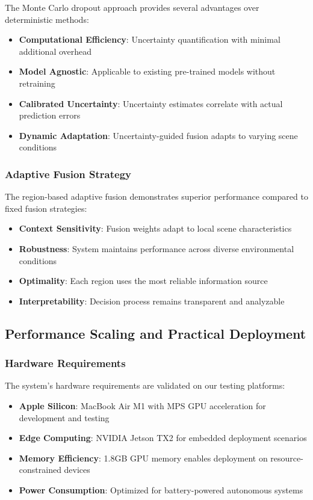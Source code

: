 \documentclass[10pt]{article}
\begin{document}
The Monte Carlo dropout approach provides several advantages over deterministic methods:

\begin{itemize}
\item \textbf{Computational Efficiency}: Uncertainty quantification with minimal additional overhead
\item \textbf{Model Agnostic}: Applicable to existing pre-trained models without retraining
\item \textbf{Calibrated Uncertainty}: Uncertainty estimates correlate with actual prediction errors
\item \textbf{Dynamic Adaptation}: Uncertainty-guided fusion adapts to varying scene conditions
\end{itemize}

\subsubsection{Adaptive Fusion Strategy}

The region-based adaptive fusion demonstrates superior performance compared to fixed fusion strategies:

\begin{itemize}
\item \textbf{Context Sensitivity}: Fusion weights adapt to local scene characteristics
\item \textbf{Robustness}: System maintains performance across diverse environmental conditions
\item \textbf{Optimality}: Each region uses the most reliable information source
\item \textbf{Interpretability}: Decision process remains transparent and analyzable
\end{itemize}

\subsection{Performance Scaling and Practical Deployment}

\subsubsection{Hardware Requirements}

The system's hardware requirements are validated on our testing platforms:

\begin{itemize}
\item \textbf{Apple Silicon}: MacBook Air M1 with MPS GPU acceleration for development and testing
\item \textbf{Edge Computing}: NVIDIA Jetson TX2 for embedded deployment scenarios
\item \textbf{Memory Efficiency}: 1.8GB GPU memory enables deployment on resource-constrained devices
\item \textbf{Power Consumption}: Optimized for battery-powered autonomous systems
\end{itemize}
\end{document}
